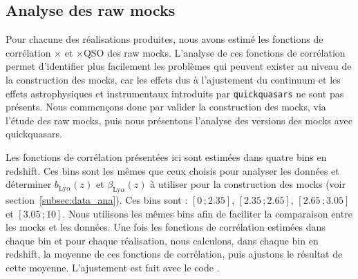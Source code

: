 \subsection{Analyse des raw mocks}
Pour chacune des \Nmocks{} réalisations produites, nous avons estimé les fonctions de corrélation \lya{}$\times$\lya{} et \lya{}$\times$QSO des raw mocks.
L'analyse de ces fonctions de corrélation permet d'identifier plus facilement les problèmes qui peuvent exister au niveau de la construction des mocks, car les effets dus à l'ajustement du continuum et les effets astrophysiques et instrumentaux introduits par \texttt{quickquasars} ne sont pas présents. Nous commençons donc par valider la construction des mocks, via l'étude des raw mocks, puis nous présentons l'analyse des versions des mocks avec quickquasars.

Les fonctions de corrélation présentées ici sont estimées dans quatre bins en redshift. Ces bins sont les mêmes que ceux choisis pour analyser les données et déterminer $b_{\mathrm{Ly}\alpha}(z)$ et $\beta_{\mathrm{Ly}\alpha}(z)$ à utiliser pour la construction des mocks (voir section~\ref{subsec:data_ana}). Ces bins sont : $[\num{0}\,;\num{2.35}]$, $[\num{2.35}\,;\num{2.65}]$, $[\num{2.65}\,;\num{3.05}]$ et $[\num{3.05}\,;\num{10}]$. Nous utilisons les mêmes bins afin de faciliter la comparaison entre les mocks et les données.
Une fois les fonctions de corrélation estimées dans chaque bin et pour chaque réalisation, nous calculons, dans chaque bin en redshift, la moyenne de ces fonctions de corrélation, puis ajustons le résultat de cette moyenne. L'ajustement est fait avec le code \picca{}.

